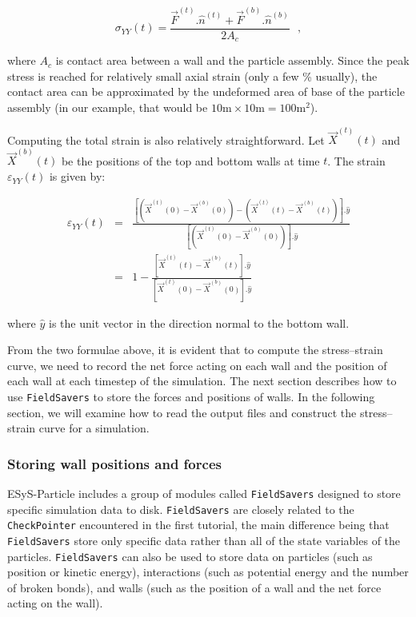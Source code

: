 \begin{equation}
\sigma_{YY} (t) = \frac{\vec{F}^{(t)} . \hat{n}^{(t)} + \vec{F}^{(b)} . \hat{n}^{(b)}}{2 A_c} \ \ \ , \label{eq:stress}
\end{equation}

\noindent
where $A_c$ is contact area between a wall and the particle assembly. Since the peak stress is reached for relatively small axial strain (only a few \% usually), the contact area can be approximated by the undeformed area of base of the particle assembly (in our example, that would be $10 \mathrm{m} \times 10 \mathrm{m} = 100 \mathrm{m}^2$). 

Computing the total strain is also relatively straightforward. Let $\vec{X}^{(t)} (t)$ and $\vec{X}^{(b)} (t)$ be the positions of the top and bottom walls at time $t$. The strain $\varepsilon_{YY} (t)$ is given by:

\begin{eqnarray} 
\varepsilon_{YY} (t) & = & \frac{\left[ \left( \vec{X}^{(t)} (0) - \vec{X}^{(b)} (0) \right) - \left( \vec{X}^{(t)} (t) - \vec{X}^{(b)} (t) \right) \right] . \hat{y}}{\left[ \left( \vec{X}^{(t)} (0) - \vec{X}^{(b)} (0) \right) \right] . \hat{y}} \\
 & = & 1 - \frac{\left[ \vec{X}^{(t)} (t) - \vec{X}^{(b)} (t) \right] . \hat{y}}{\left[ \vec{X}^{(t)} (0) - \vec{X}^{(b)} (0) \right] . \hat{y}} \label{eq:strain}
\end{eqnarray} 

\noindent
where $\hat{y}$ is the unit vector in the direction normal to the bottom wall.

From the two formulae above, it is evident that to compute the stress--strain curve, we need to record the net force acting on each wall and the position of each wall at each timestep of the simulation. The next section describes how to use \texttt{FieldSavers} to store the forces and positions of walls. In the following section, we will examine how to read the output files and construct the stress--strain curve for a simulation.

\subsubsection{Storing wall positions and forces}

ESyS-Particle includes a group of modules called \texttt{FieldSavers} designed to store specific simulation data to disk. \texttt{FieldSavers} are closely related to the \texttt{CheckPointer} encountered in the first tutorial, the main difference being that \texttt{FieldSavers} store only specific data rather than all of the state variables of the particles. \texttt{FieldSavers} can also be used to store data on particles (such as position or kinetic energy), interactions (such as potential energy and the number of broken bonds), and walls (such as the position of a wall and the net force acting on the wall). 

